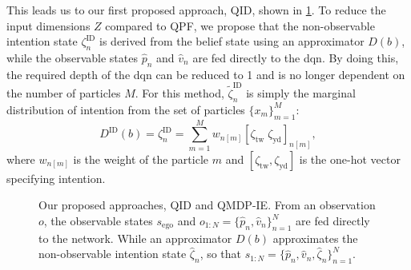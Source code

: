 This leads us to our first proposed approach, QID, shown in \ref{fig:qid}. To reduce the input dimensions $Z$ compared to QPF, we propose that the non-observable intention state $\zeta^\mathrm{ID}_n$ is derived from the belief state using an approximator $D(b)$, while the observable states $\hat{p}_n$ and $\hat{v}_n$ are fed directly to the \gls{dqn}. By doing this, the required depth of the \gls{dqn} can be reduced to 1 and is no longer dependent on the number of particles $M$. 
For this method, $\tilde{\zeta}^\mathrm{ID}_n$ is simply the marginal distribution of intention from the set of particles $\{ x_m \}^M_{m=1}$: 
\begin{equation}
    D^\mathrm{ID}(b) = \zeta^\mathrm{ID}_n = \sum_{m=1}^M w_{n[m]} [\zeta_\text{tw} \; \zeta_\text{yd}]_{n[m]},
    \label{eq:ID_i}
\end{equation}
where $w_{n[m]}$ is the weight of the particle $m$ and $[\zeta_\text{tw} , \zeta_\text{yd}]$ is the one-hot vector specifying intention. 

\begin{figure}[!h]
    \centering
        
        \caption{Our proposed approaches, QID and QMDP-IE. From an observation $o$, the observable states $s_\mathrm{ego}$ and $o_{1:N}=\{\hat{p}_n, \hat{v}_n\}_{n=1}^N$ are fed directly to the network. While an approximator $D(b)$ approximates the non-observable intention state $\hat \zeta_n$, so that $s_{1:N}=\{\hat p_n, \hat v_n, \hat \zeta_n \}^N_{n=1}$.
        }
    \label{fig:qid}
\end{figure}

